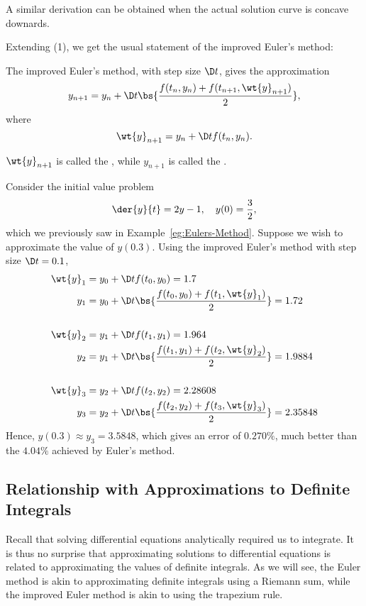 A similar derivation can be obtained when the actual solution curve is concave downards.

Extending (1), we get the usual statement of the improved Euler's method:

\begin{recipe}
    The improved Euler's method, with step size $\D t$, gives the approximation \[y_{n+1} = y_n + \D t \bs{\frac{f(t_n, y_n) + f(t_{n+1}, \wt{y}_{n+1})}{2}},\] where \[\wt{y}_{n+1} = y_n + \D t f(t_n, y_n).\]
\end{recipe}

\begin{definition}
    $\wt{y}_{n + 1}$ is called the , while $y_{n+1}$ is called the .
\end{definition}

\begin{example}
    Consider the initial value problem \[\der{y}{t} = 2y - 1, \quad y(0) = \frac32,\] which we previously saw in Example~\ref{eg:Eulers-Method}. Suppose we wish to approximate the value of $y(0.3)$. Using the improved Euler's method with step size $\D t = 0.1$,
    \begin{align*}
        \wt{y}_1 &= y_0 + \D t f(t_0, y_0) = 1.7\\
        y_1 &= y_0 + \D t \bs{\frac{f(t_0, y_0) + f(t_1, \wt{y}_1)}{2}} = 1.72 \\ \\
        \wt{y}_2 &= y_1 + \D t f(t_1, y_1) = 1.964\\
        y_2 &= y_1 + \D t \bs{\frac{f(t_1, y_1) + f(t_2, \wt{y}_2)}{2}} = 1.9884 \\ \\
        \wt{y}_3 &= y_2 + \D t f(t_2, y_2) = 2.28608\\
        y_3 &= y_2 + \D t \bs{\frac{f(t_2, y_2) + f(t_3, \wt{y}_3)}{2}} = 2.35848
    \end{align*}
    Hence, $y(0.3) \approx y_3 = 3.5848$, which gives an error of $0.270\%$, much better than the $4.04\%$ achieved by Euler's method.
\end{example}

\subsection{Relationship with Approximations to Definite Integrals}

Recall that solving differential equations analytically required us to integrate. It is thus no surprise that approximating solutions to differential equations is related to approximating the values of definite integrals. As we will see, the Euler method is akin to approximating definite integrals using a Riemann sum, while the improved Euler method is akin to using the trapezium rule.

